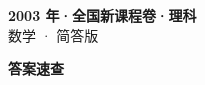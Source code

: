 \documentclass[zihao=-4, a4paper]{ctexart}
\begin{document}
\begin{center}
  {\Large\bfseries 2003 年·全国新课程卷·理科}\\[4pt]
  {\large 数学 · 简答版}
\end{center}
\medskip
{}

\clearpage
{}
\begin{center}{\Large\bfseries 答案速查}\end{center}
\medskip

\end{document}
